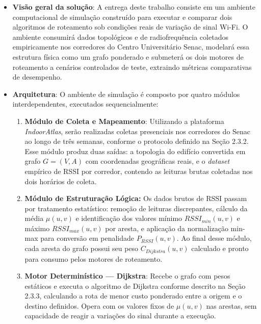 \documentclass[
    12pt,                %
    openright,           %
    oneside,             %
    a4paper,             %
    english,             %
    brazil               %
]{abntex2}
\begin{document}
\begin{itemize}
\item \textbf{Visão geral da solução}: A entrega deste trabalho consiste em um
    ambiente computacional de simulação construído para executar e comparar dois
    algoritmos de roteamento sob condições reais de variação de sinal Wi-Fi. O
    ambiente consumirá dados topológicos e de radiofrequência coletados empiricamente
    nos corredores do Centro Universitário Senac, modelará essa estrutura física como
    um grafo ponderado e submeterá os dois motores de roteamento a cenários
    controlados de teste, extraindo métricas comparativas de desempenho.

    \item \textbf{Arquitetura}: O ambiente de simulação é composto por quatro módulos
    interdependentes, executados sequencialmente:
    \begin{enumerate}
        \item \textbf{Módulo de Coleta e Mapeamento}: Utilizando a plataforma
        \textit{IndoorAtlas}, serão realizadas coletas presenciais nos corredores do
        Senac ao longo de três semanas, conforme o protocolo definido na Seção 2.3.2.
        Esse módulo produz duas saídas: a topologia do edifício convertida em grafo
        $G = (V, A)$ com coordenadas geográficas reais, e o \textit{dataset} empírico
        de RSSI por corredor, contendo as leituras brutas coletadas nos dois horários
        de coleta.

        \item \textbf{Módulo de Estruturação Lógica:} Os dados brutos de RSSI passam por
        tratamento estatístico: remoção de leituras discrepantes, cálculo da média $\mu(u, v)$
        e identificação dos valores mínimo $RSSI_{min}(u, v)$ e máximo $RSSI_{max}(u, v)$ por aresta,
        e aplicação da normalização min-max para conversão em penalidade $P_{RSSI}(u, v)$. Ao final
        desse módulo, cada aresta do grafo possui seu peso $C_{Dijkstra}(u, v)$ calculado e pronto
        para consumo pelos motores de roteamento. %

        \item \textbf{Motor Determinístico --- Dijkstra}: Recebe o grafo com pesos
        estáticos e executa o algoritmo de Dijkstra conforme descrito na Seção 2.3.3,
        calculando a rota de menor custo ponderado entre a origem e o destino
        definidos. Opera com os valores fixos de $\mu(u,v)$ nas arestas, sem
        capacidade de reagir a variações do sinal durante a execução.


\end{enumerate}
\end{itemize}
\end{document}
